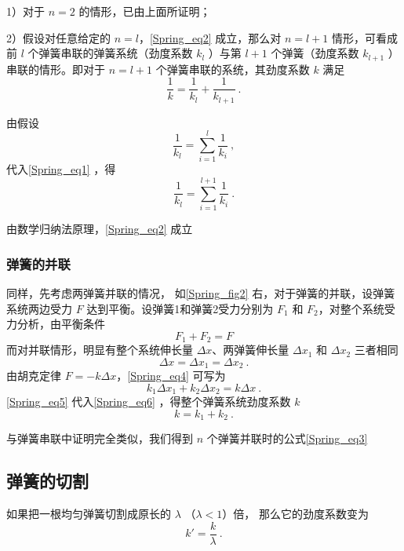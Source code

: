 1）对于 $n=2$ 的情形，已由上面所证明；

2）假设对任意给定的 $n=l$，\autoref{Spring_eq2} 成立，那么对 $n=l+1$ 情形，可看成前 $l$ 个弹簧串联的弹簧系统（劲度系数 $k_l$ ）与第 $l+1$ 个弹簧（劲度系数 $ k_{l+1}$ ）串联的情形。即对于 $n=l+1$ 个弹簧串联的系统，其劲度系数 $k$ 满足
\begin{equation}\label{Spring_eq1}
\frac{1}{k}=\frac{1}{k_l}+\frac{1}{k_{l+1}}~.
\end{equation}

由假设
\begin{equation}
\frac{1}{k_l}=\sum\limits_{i=1}^{l}\frac{1}{k_i}~,
\end{equation}
代入\autoref{Spring_eq1} ，得
\begin{equation}
\frac{1}{k_l}=\sum\limits_{i=1}^{l+1}\frac{1}{k_i}~.
\end{equation}

由数学归纳法原理，\autoref{Spring_eq2} 成立
\subsubsection{弹簧的并联}
同样，先考虑两弹簧并联的情况，
如\autoref{Spring_fig2} 右，对于弹簧的并联，设弹簧系统两边受力 $F$ 达到平衡。设弹簧1和弹簧2受力分别为 $F_1$ 和 $F_2$，对整个系统受力分析，由平衡条件
\begin{equation}
F_1+F_2=F
\end{equation}
而对并联情形，明显有整个系统伸长量 $\Delta x$、两弹簧伸长量 $\Delta x_1$ 和 $\Delta x_2$ 三者相同
\begin{equation}\label{Spring_eq5}
\Delta x=\Delta x_1=\Delta x_2~.
\end{equation}
由胡克定律 $F=-k\Delta x$，\autoref{Spring_eq4} 可写为
\begin{equation}\label{Spring_eq6}
k_1\Delta x_1+k_2\Delta x_2=k\Delta x~.
\end{equation}
\autoref{Spring_eq5} 代入\autoref{Spring_eq6} ，得整个弹簧系统劲度系数 $k$
\begin{equation}
k=k_1+k_2~.
\end{equation}

与弹簧串联中证明完全类似，我们得到 $n$ 个弹簧并联时的公式\autoref{Spring_eq3} 

\subsection{弹簧的切割}
如果把一根均匀弹簧切割成原长的 $\lambda$ （$\lambda < 1$）倍， 那么它的劲度系数变为
\begin{equation}\label{Spring_eq4}
k' = \frac{k}{\lambda}~.
\end{equation}

